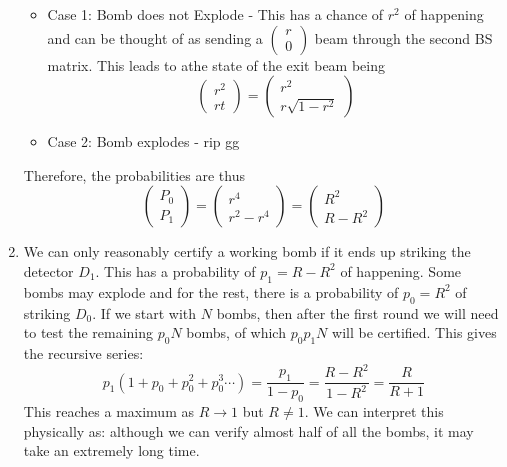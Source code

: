 \begin{sol}
\begin{enumerate}[label=\textbf{(\alph*)}]
\begin{itemize}
\item Case 1: Bomb does not Explode - This has a chance of $r^2$ of happening and can be thought of as sending a $\begin{pmatrix}r\\0\end{pmatrix}$ beam through the second BS matrix. This leads to athe state of the exit beam being
$$
\begin{pmatrix}
r^2 \\
rt
\end{pmatrix}
=
\begin{pmatrix}
r^2 \\
r\sqrt{1-r^2}
\end{pmatrix}
$$
\item Case 2: Bomb explodes - rip gg
\end{itemize}
Therefore, the probabilities are thus
$$
\begin{pmatrix} 
P_0 \\ 
P_1
\end{pmatrix} =
\begin{pmatrix}
r^4 \\
r^2-r^4
\end{pmatrix}
=
\begin{pmatrix}
R^2 \\
R-R^2
\end{pmatrix}
$$
\item We can only reasonably certify a working bomb if it ends up striking the detector $D_1$. This has a probability of $p_1=R-R^2$ of happening. Some bombs may explode and for the rest, there is a probability of $p_0=R^2$ of striking $D_0$. If we start with $N$ bombs, then after the first round we will need to test the remaining $p_0N$ bombs, of which $p_0p_1N$ will be certified. This gives the recursive series:
$$p_1(1+p_0+p_0^2+p_0^3\cdots)=\frac{p_1}{1-p_0}=\frac{R-R^2}{1-R^2}=\frac{R}{R+1}$$
This reaches a maximum as $R \to 1$ but $R \neq 1$. We can interpret this physically as: although we can verify almost half of all the bombs, it may take an extremely long time.
\end{enumerate}

\end{sol}